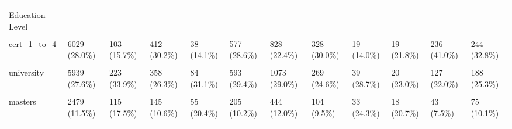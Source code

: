 \documentclass[
  single column]{article}
\begin{document}
\begin{landscape}
\begin{longtable}[t]{llllllllllll}
\cellcolor{gray!10}{Missing} & \cellcolor{gray!10}{66 (0.3\%)} & \cellcolor{gray!10}{3 (0.5\%)} & \cellcolor{gray!10}{3 (0.2\%)} & \cellcolor{gray!10}{0 (0\%)} & \cellcolor{gray!10}{7 (0.3\%)} & \cellcolor{gray!10}{18 (0.5\%)} & \cellcolor{gray!10}{1 (0.1\%)} & \cellcolor{gray!10}{0 (0\%)} & \cellcolor{gray!10}{0 (0\%)} & \cellcolor{gray!10}{4 (0.7\%)} & \cellcolor{gray!10}{4 (0.5\%)}\\
Education Level &  &  &  &  &  &  &  &  &  &  & \\
\cellcolor{gray!10}{no\_qualification} & \cellcolor{gray!10}{322 (1.5\%)} & \cellcolor{gray!10}{26 (4.0\%)} & \cellcolor{gray!10}{15 (1.1\%)} & \cellcolor{gray!10}{1 (0.4\%)} & \cellcolor{gray!10}{24 (1.2\%)} & \cellcolor{gray!10}{41 (1.1\%)} & \cellcolor{gray!10}{30 (2.7\%)} & \cellcolor{gray!10}{0 (0\%)} & \cellcolor{gray!10}{2 (2.3\%)} & \cellcolor{gray!10}{8 (1.4\%)} & \cellcolor{gray!10}{23 (3.1\%)}\\
cert\_1\_to\_4 & 6029 (28.0\%) & 103 (15.7\%) & 412 (30.2\%) & 38 (14.1\%) & 577 (28.6\%) & 828 (22.4\%) & 328 (30.0\%) & 19 (14.0\%) & 19 (21.8\%) & 236 (41.0\%) & 244 (32.8\%)\\
\addlinespace
\cellcolor{gray!10}{cert\_5\_to\_6} & \cellcolor{gray!10}{2659 (12.3\%)} & \cellcolor{gray!10}{32 (4.9\%)} & \cellcolor{gray!10}{209 (15.3\%)} & \cellcolor{gray!10}{24 (8.9\%)} & \cellcolor{gray!10}{279 (13.8\%)} & \cellcolor{gray!10}{554 (15.0\%)} & \cellcolor{gray!10}{176 (16.1\%)} & \cellcolor{gray!10}{10 (7.4\%)} & \cellcolor{gray!10}{7 (8.0\%)} & \cellcolor{gray!10}{94 (16.3\%)} & \cellcolor{gray!10}{106 (14.2\%)}\\
university & 5939 (27.6\%) & 223 (33.9\%) & 358 (26.3\%) & 84 (31.1\%) & 593 (29.4\%) & 1073 (29.0\%) & 269 (24.6\%) & 39 (28.7\%) & 20 (23.0\%) & 127 (22.0\%) & 188 (25.3\%)\\
\cellcolor{gray!10}{post\_grad} & \cellcolor{gray!10}{3120 (14.5\%)} & \cellcolor{gray!10}{39 (5.9\%)} & \cellcolor{gray!10}{176 (12.9\%)} & \cellcolor{gray!10}{39 (14.4\%)} & \cellcolor{gray!10}{276 (13.7\%)} & \cellcolor{gray!10}{565 (15.3\%)} & \cellcolor{gray!10}{129 (11.8\%)} & \cellcolor{gray!10}{26 (19.1\%)} & \cellcolor{gray!10}{13 (14.9\%)} & \cellcolor{gray!10}{58 (10.1\%)} & \cellcolor{gray!10}{87 (11.7\%)}\\
masters & 2479 (11.5\%) & 115 (17.5\%) & 145 (10.6\%) & 55 (20.4\%) & 205 (10.2\%) & 444 (12.0\%) & 104 (9.5\%) & 33 (24.3\%) & 18 (20.7\%) & 43 (7.5\%) & 75 (10.1\%)\\
\cellcolor{gray!10}{doctorate} & \cellcolor{gray!10}{835 (3.9\%)} & \cellcolor{gray!10}{57 (8.7\%)} & \cellcolor{gray!10}{42 (3.1\%)} & \cellcolor{gray!10}{24 (8.9\%)} & \cellcolor{gray!10}{54 (2.7\%)} & \cellcolor{gray!10}{158 (4.3\%)} & \cellcolor{gray!10}{47 (4.3\%)} & \cellcolor{gray!10}{8 (5.9\%)} & \cellcolor{gray!10}{8 (9.2\%)} & \cellcolor{gray!10}{4 (0.7\%)} & \cellcolor{gray!10}{9 (1.2\%)}\\

\end{longtable}
\end{landscape}
\end{document}
